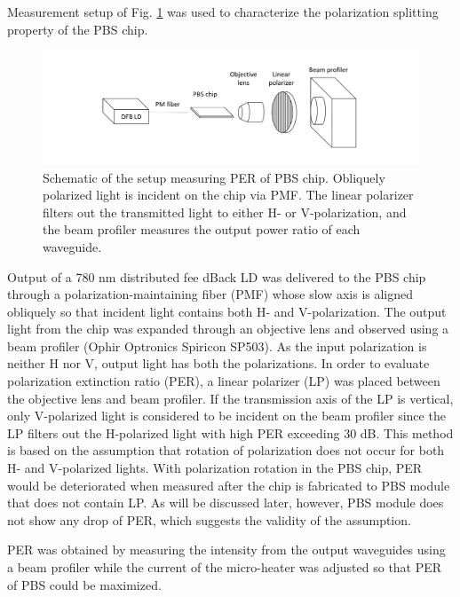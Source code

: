 \documentclass[letterpaper, 10pt]{article}
\begin{document}
Measurement setup of Fig. \ref{fig:setup}  was used to characterize the polarization splitting property of the PBS chip.
\begin{figure}
  \centering
  \includegraphics[width=13cm]{./setup.pdf}
  \caption{Schematic of the setup measuring PER of PBS chip. Obliquely polarized light is incident on the chip via PMF. The linear polarizer filters out the transmitted light to either H- or V-polarization, and the beam profiler measures the output power ratio of each waveguide.}
  \label{fig:setup}
\end{figure}
Output of a 780 nm distributed fee dBack LD was delivered to the PBS chip through a polarization-maintaining fiber (PMF) whose slow axis is aligned obliquely so that incident light contains both H- and V-polarization.
The output light from the chip was expanded through an objective lens and observed using a beam profiler (Ophir Optronics Spiricon SP503).
As the input polarization is neither H nor V, output light has both the polarizations.
In order to evaluate polarization extinction ratio (PER), a linear polarizer (LP) was placed between the objective lens and beam profiler.
If the transmission axis of the LP is vertical, only V-polarized light is considered to be incident on the beam profiler since the LP filters out the H-polarized light with high PER exceeding 30 dB.
This method is based on the assumption that rotation of polarization does not occur for both H- and V-polarized lights.
With polarization rotation in the PBS chip, PER would be deteriorated when measured after the chip is fabricated to PBS module that does not contain LP.
As will be discussed later, however, PBS module does not show any drop of PER, which suggests the validity of the assumption.

PER was obtained by measuring the intensity from the output waveguides using a beam profiler while the current of the micro-heater was adjusted so that PER of PBS could be maximized.
\end{document}
